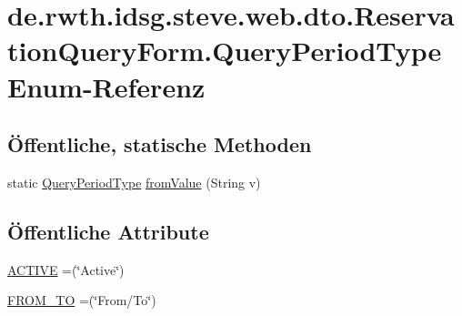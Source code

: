 \hypertarget{enumde_1_1rwth_1_1idsg_1_1steve_1_1web_1_1dto_1_1_reservation_query_form_1_1_query_period_type}{\section{de.\+rwth.\+idsg.\+steve.\+web.\+dto.\+Reservation\+Query\+Form.\+Query\+Period\+Type Enum-\/\+Referenz}
\label{enumde_1_1rwth_1_1idsg_1_1steve_1_1web_1_1dto_1_1_reservation_query_form_1_1_query_period_type}
}
\subsection*{Öffentliche, statische Methoden}
\begin{DoxyCompactItemize}
\item 
static \hyperlink{enumde_1_1rwth_1_1idsg_1_1steve_1_1web_1_1dto_1_1_reservation_query_form_1_1_query_period_type}{Query\+Period\+Type} \hyperlink{enumde_1_1rwth_1_1idsg_1_1steve_1_1web_1_1dto_1_1_reservation_query_form_1_1_query_period_type_afa1f2dc25b86e1a977cf63a251d26bf3}{from\+Value} (String v)
\end{DoxyCompactItemize}
\subsection*{Öffentliche Attribute}
\begin{DoxyCompactItemize}
\item 
\hyperlink{enumde_1_1rwth_1_1idsg_1_1steve_1_1web_1_1dto_1_1_reservation_query_form_1_1_query_period_type_a775d5731727cbdda2f9cba8b51a4ca5a}{A\+C\+T\+I\+V\+E} =(\char`\"{}Active\char`\"{})
\item 
\hyperlink{enumde_1_1rwth_1_1idsg_1_1steve_1_1web_1_1dto_1_1_reservation_query_form_1_1_query_period_type_a44ca90614a7a7c041d770c226171a9e7}{F\+R\+O\+M\+\_\+\+T\+O} =(\char`\"{}From/To\char`\"{})
\end{DoxyCompactItemize}


